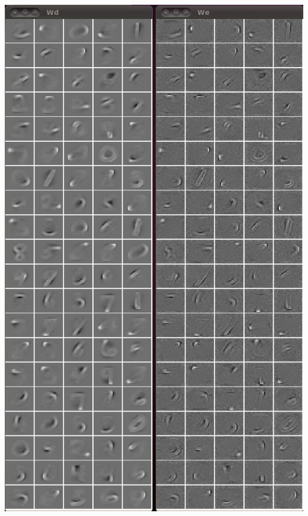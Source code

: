 \documentclass{beamer}
\begin{document}
\begin{frame}
\begin{center}
\includegraphics[scale = 0.20]{strokes.png}
\end{center} 
\end{frame} 
\end{document}
